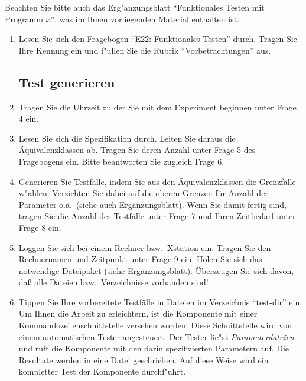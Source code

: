 
Beachten Sie bitte auch das Erg"anzungsblatt "`Funktionales Testen mit 
Programm $x$"', was im Ihnen vorliegenden Material enthalten ist.

\begin{enumerate}

\item Lesen Sie sich den Fragebogen "`E22: Funktionales Testen"'
durch. Tragen Sie Ihre Kennung ein und f"ullen Sie die Rubrik
"`Vorbetrachtungen"' aus. 

\subsection*{Test generieren}

\item Tragen Sie die Uhrzeit zu der Sie mit dem Experiment beginnen 
unter Frage 4 ein.

\item Lesen Sie sich die Spezifikation durch. Leiten Sie daraus
die \"Aquivalenzklassen ab.
Tragen Sie deren Anzahl unter Frage 5 des Fragebogens ein.
Bitte beantworten Sie zugleich Frage 6.

\item Generieren Sie Testf\"alle, indem Sie aus den \"Aquivalenzklassen 
die Grenzf\"alle w"ahlen.
Verzichten Sie dabei auf die oberen Grenzen f\"ur Anzahl der
Parameter o.\"a.~(siehe auch Erg\"anzungsblatt).
Wenn Sie damit fertig sind, tragen Sie die Anzahl der Testf\"alle
unter Frage 7 und Ihren Zeitbedarf unter Frage 8 ein.

\item Loggen Sie sich bei einem Rechner bzw.~Xstation ein.  
Tragen Sie den Rechnernamen und Zeitpunkt unter Frage 9 ein.  
Holen Sie sich das notwendige Dateipaket (siehe Erg\"anzungsblatt).
\"Uberzeugen Sie sich davon, da{\ss} alle Dateien bzw.~Verzeichnisse
vorhanden sind! 

\item Tippen Sie Ihre vorbereitete Testf\"alle in Dateien im
Verzeichnis "`test-dir"' ein. Um Ihnen die Arbeit zu erleichtern, ist die
Komponente mit einer Kommandozeilenschnittstelle versehen worden. Diese
Schnittstelle wird von einem automatischen Tester angesteuert. Der Tester
lie"st {\em Parameterdateien\/} und ruft die Komponente mit den darin
spezifizierten Parametern auf. Die Resultate werden in eine Datei geschrieben.
Auf diese Weise wird ein kompletter Test der Komponente durchf"uhrt. 


\end{enumerate}
